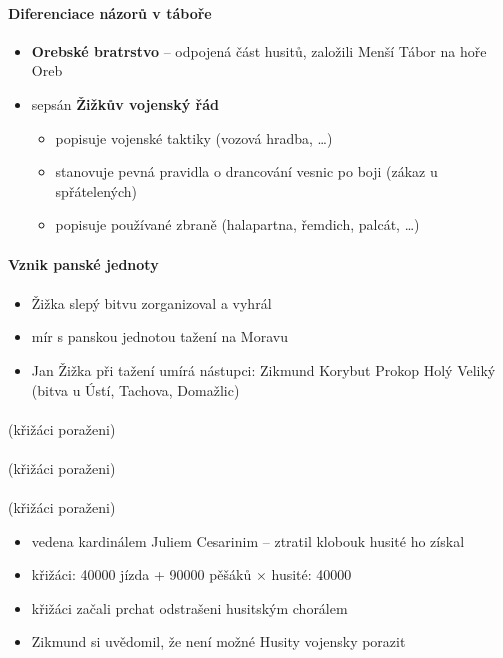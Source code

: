 \paragraph{Diferenciace názorů v táboře}
\begin{itemize}
\item \textbf{Orebské bratrstvo} -- odpojená část husitů, založili Menší Tábor na hoře Oreb
\item sepsán \textbf{Žižkův vojenský řád}
	\begin{itemize}
	\item popisuje vojenské taktiky (vozová hradba, \ldots)
	\item stanovuje pevná pravidla o drancování vesnic po boji (zákaz u spřátelených)
	\item popisuje používané zbraně (halapartna, řemdich, palcát, \ldots)
	\end{itemize}
\end{itemize}



\paragraph{Vznik panské jednoty}


\paragraph{}
\begin{itemize}
\item Žižka slepý bitvu zorganizoval a vyhrál
\item[\ra] mír s panskou jednotou \ra tažení na Moravu
\item Jan Žižka při tažení umírá \ra nástupci: Zikmund Korybut \ra Prokop Holý Veliký (bitva u Ústí, Tachova, Domažlic)
\end{itemize}

\paragraph{} (křižáci poraženi)
\paragraph{} (křižáci poraženi)
\paragraph{} (křižáci poraženi)
\begin{itemize}
\item vedena kardinálem Juliem Cesarinim -- ztratil klobouk \ra husité ho získal
\item křižáci: 40000 jízda + 90000 pěšáků $\times$ husité: 40000
\item křižáci začali prchat odstrašeni husitským chorálem
\item[\ra] Zikmund si uvědomil, že není možné Husity vojensky porazit
\end{itemize}

